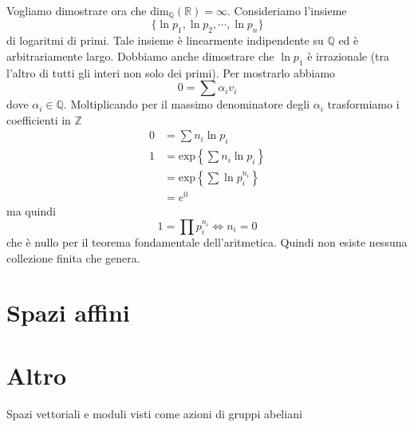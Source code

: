 \documentclass[a4paper]{article}
\begin{document}
Vogliamo dimostrare ora che \(\text{dim}_{\mathbb{Q}}(\mathbb{R}) = \infty\).
Consideriamo l'insieme
\[
    \{
        \ln p_1, \ln p_2, \cdots, \ln p_n    
    \}
\]
di logaritmi di primi. Tale insieme è linearmente indipendente su \(\mathbb{Q}\)
ed è arbitrariamente largo.
Dobbiamo anche dimostrare che \(\ln p_1\) è irrazionale (tra l'altro di tutti gli interi non solo dei primi).
Per mostrarlo abbiamo
\[
    0 = \sum \alpha_i v_i
\]
dove \(\alpha_i \in \mathbb{Q}\).
Moltiplicando per il massimo denominatore degli \(\alpha_i\)
trasformiamo i coefficienti in \(\mathbb{Z}\)
\begin{align*}
    0 &= \sum n_i \ln p_i \\
    1 &= \text{exp}\left\{
        \sum n_i \ln p_i
    \right\} \\
    &= \text{exp}\left\{
        \sum \ln p_i^{n_i}
    \right\} \\
    &= e^0
\end{align*}
ma quindi
\[
    1 = \prod p_i^{n_i} \iff n_i = 0
\]
che è nullo per il teorema fondamentale dell'aritmetica.
Quindi non esiste nessuna collezione finita che genera.

\pagebreak

\section{Spazi affini}


\section{Altro}

Spazi vettoriali e moduli visti come azioni di gruppi abeliani
\end{document}
